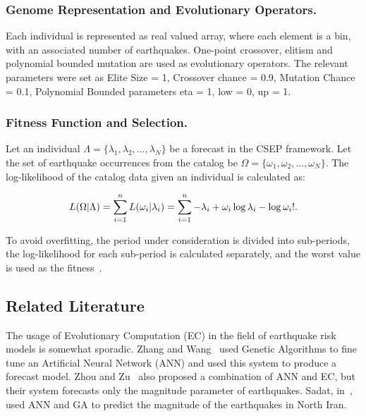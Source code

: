 \subsubsection*{Genome Representation and Evolutionary Operators.}

Each individual is represented as real valued array, where each
element is a bin, with an associated number of earthquakes. One-point
crossover, elitism and polynomial bounded mutation are used as
evolutionary operators. The relevant parameters were set as Elite Size
= 1, Crossover chance = 0.9, Mutation Chance = 0.1, Polynomial Bounded
parameters eta = 1, low = 0, up = 1.


\subsubsection*{Fitness Function and Selection.}

Let an individual $\Lambda = \{\lambda_1, \lambda_2, \ldots,
\lambda_N\}$ be a forecast in the CSEP framework. Let the set of
earthquake occurrences from the catalog be $\Omega = \{\omega_1,
\omega_2, \ldots, \omega_N\}$. The log-likelihood of the catalog data
given an individual is calculated as:

\begin{equation}
L(\Omega|\Lambda) = \sum_{i=1}^{n}L(\omega_i|\lambda_i) \\ =
\sum_{i=1}^{n} -\lambda_i + \omega_i\log\lambda_i - \log\omega_i! .
\end{equation}

To avoid overfitting, the period under consideration is divided into
sub-periods, the log-likelihood for each sub-period is calculated
separately, and the worst value is used as the fitness~\cite{ecta14}.

\subsection{Related Literature}

The usage of Evolutionary Computation (EC) in the field of earthquake
risk models is somewhat sporadic. Zhang and Wang~\cite{Zhang2012} used
Genetic Algorithms to fine tune an Artificial Neural Network (ANN) and
used this system to produce a forecast model. Zhou and
Zu~\cite{Feiyan2014} also proposed a combination of ANN and EC, but
their system forecasts only the magnitude parameter of
earthquakes. Sadat, in~\cite{sadat2015application}, used ANN and GA to
predict the magnitude of the earthquakes in North Iran.

